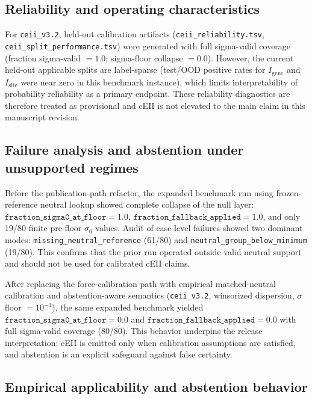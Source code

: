 \documentclass[11pt]{article}
\begin{document}
\subsection{Reliability and operating characteristics}

For \texttt{ceii\_v3.2}, held-out calibration artifacts (\texttt{ceii\_reliability.tsv}, \texttt{ceii\_split\_performance.tsv}) were generated with full sigma-valid coverage (fraction sigma-valid $=1.0$; sigma-floor collapse $=0.0$). However, the current held-out applicable splits are label-sparse (test/OOD positive rates for $I_{\mathrm{gene}}$ and $I_{\mathrm{site}}$ were near zero in this benchmark instance), which limits interpretability of probability reliability as a primary endpoint. These reliability diagnostics are therefore treated as provisional and cEII is not elevated to the main claim in this manuscript revision.

\subsection{Failure analysis and abstention under unsupported regimes}

Before the publication-path refactor, the expanded benchmark run using frozen-reference neutral lookup showed complete collapse of the null layer: $\texttt{fraction\_sigma0\_at\_floor}=1.0$, $\texttt{fraction\_fallback\_applied}=1.0$, and only 19/80 finite pre-floor $\sigma_0$ values. Audit of case-level failures showed two dominant modes: \texttt{missing\_neutral\_reference} (61/80) and \texttt{neutral\_group\_below\_minimum} (19/80). This confirms that the prior run operated outside valid neutral support and should not be used for calibrated cEII claims.

After replacing the force-calibration path with empirical matched-neutral calibration and abstention-aware semantics (\texttt{ceii\_v3.2}, winsorized dispersion, $\sigma$ floor $=10^{-3}$), the same expanded benchmark yielded $\texttt{fraction\_sigma0\_at\_floor}=0.0$ and $\texttt{fraction\_fallback\_applied}=0.0$ with full sigma-valid coverage (80/80). This behavior underpins the release interpretation: cEII is emitted only when calibration assumptions are satisfied, and abstention is an explicit safeguard against false certainty.

\subsection{Empirical applicability and abstention behavior}
\end{document}
